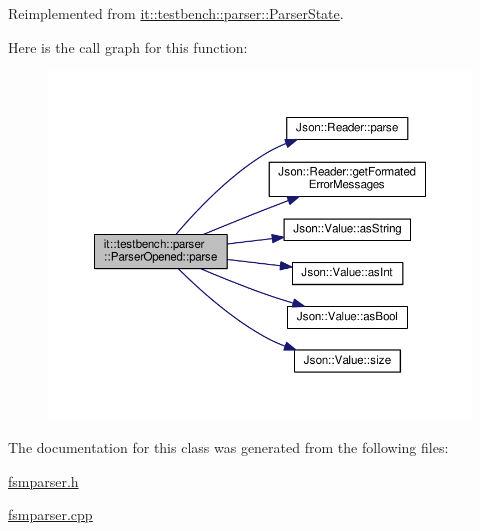 Reimplemented from \hyperlink{classit_1_1testbench_1_1parser_1_1ParserState_a0ab282825d0fcfa537cdee099f59228e}{it\-::testbench\-::parser\-::\-Parser\-State}.



Here is the call graph for this function\-:
\nopagebreak
\begin{figure}[H]
\begin{center}
\leavevmode
\includegraphics[width=350pt]{d3/d26/classit_1_1testbench_1_1parser_1_1ParserOpened_a1652b80f1a14d0c7274d044f88872167_cgraph}
\end{center}
\end{figure}




The documentation for this class was generated from the following files\-:\begin{DoxyCompactItemize}
\item 
\hyperlink{fsmparser_8h}{fsmparser.\-h}\item 
\hyperlink{fsmparser_8cpp}{fsmparser.\-cpp}\end{DoxyCompactItemize}
